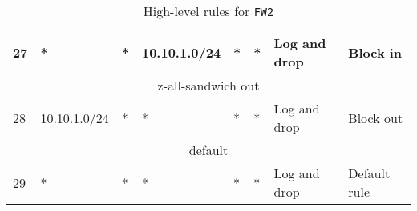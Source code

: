\documentclass[a4paper, 11pt, oneside]{article}
\begin{document}
\begin{table}[H]
{\begin{tabular}{|llllllll|}
\multicolumn{1}{|l|}{27}                        & \multicolumn{1}{l|}{*}                                                            & \multicolumn{1}{l|}{*}                                                              & \multicolumn{1}{l|}{10.10.1.0/24}                                                      & \multicolumn{1}{l|}{*}                                                                   & \multicolumn{1}{l|}{*}                 & \multicolumn{1}{l|}{Log and drop}    & Block in                               \\ \hline
\multicolumn{8}{|c|}{{\color[HTML]{FE0000} z-all-sandwich out}}                                                                                                                                                                                                                                                                                                                                                                                                                                                                        \\ \hline
\multicolumn{1}{|l|}{28}                        & \multicolumn{1}{l|}{10.10.1.0/24}                                                 & \multicolumn{1}{l|}{*}                                                              & \multicolumn{1}{l|}{*}                                                                 & \multicolumn{1}{l|}{*}                                                                   & \multicolumn{1}{l|}{*}                 & \multicolumn{1}{l|}{Log and drop}    & Block out                              \\ \hline
\multicolumn{8}{|c|}{{\color[HTML]{FE0000} default}}                                                                                                                                                                                                                                                                                                                                                                                                                                                                                   \\ \hline
\multicolumn{1}{|l|}{29}                        & \multicolumn{1}{l|}{*}                                                            & \multicolumn{1}{l|}{*}                                                              & \multicolumn{1}{l|}{*}                                                                 & \multicolumn{1}{l|}{*}                                                                   & \multicolumn{1}{l|}{*}                 & \multicolumn{1}{l|}{Log and drop}    & Default rule                           \\ \hline
\end{tabular}
}
\caption{High-level rules for \texttt{FW2}}
\end{table}
\end{document}
